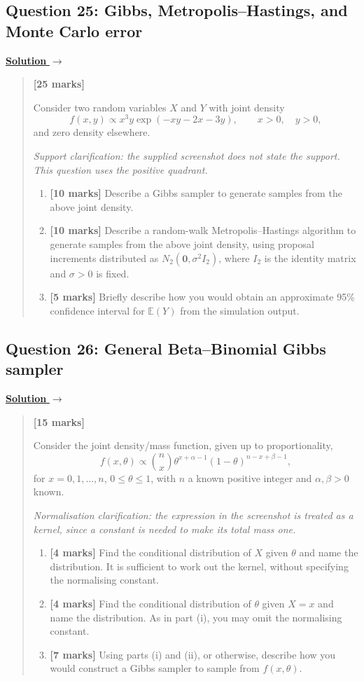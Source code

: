 \documentclass[11pt,a4paper]{article}
\newcommand{\E}{\mathbb{E}}
\newenvironment{examquestion}[2]
  {\subsection{#1}\label{question:\arabic{subsection}}\label{#2}%
   \noindent\hyperref[answer:\arabic{subsection}]{\textbf{Solution} $\rightarrow$}%
   \begin{quote}\color{statgrey}}
  {\end{quote}}
\begin{document}
\clearpage

\begin{examquestion}{Question 25: Gibbs, Metropolis--Hastings, and Monte Carlo error}{question:practice-gibbs-metropolis-hastings-and-monte-carlo-error}
\textbf{[25 marks]}

Consider two random variables $X$ and $Y$ with joint density
\[
f(x,y)\propto x^3y\exp(-xy-2x-3y),
\qquad x>0,\quad y>0,
\]
and zero density elsewhere.

\emph{Support clarification: the supplied screenshot does not state the
support. This question uses the positive quadrant.}

\begin{enumerate}[label=(\alph*)]
  \item \textbf{[10 marks]} Describe a Gibbs sampler to generate samples
        from the above joint density.
  \item \textbf{[10 marks]} Describe a random-walk Metropolis--Hastings
        algorithm to generate samples from the above joint density, using
        proposal increments distributed as $N_2(\mathbf 0,\sigma^2I_2)$,
        where $I_2$ is the identity matrix and $\sigma>0$ is fixed.
  \item \textbf{[5 marks]} Briefly describe how you would obtain an
        approximate 95\% confidence interval for $\E(Y)$ from the
        simulation output.
\end{enumerate}
\end{examquestion}

\clearpage

\begin{examquestion}{Question 26: General Beta--Binomial Gibbs sampler}{question:practice-general-beta-binomial-gibbs-sampler}
\textbf{[15 marks]}

Consider the joint density/mass function, given up to proportionality,
\[
f(x,\theta)\propto
\binom{n}{x}\theta^{x+\alpha-1}(1-\theta)^{n-x+\beta-1},
\]
for $x=0,1,\ldots,n$, $0\leq\theta\leq1$, with $n$ a known positive
integer and $\alpha,\beta>0$ known.

\emph{Normalisation clarification: the expression in the screenshot is
treated as a kernel, since a constant is needed to make its total mass one.}

\begin{enumerate}[label=(\roman*)]
  \item \textbf{[4 marks]} Find the conditional distribution of $X$ given
        $\theta$ and name the distribution. It is sufficient to work out
        the kernel, without specifying the normalising constant.
  \item \textbf{[4 marks]} Find the conditional distribution of $\theta$
        given $X=x$ and name the distribution. As in part (i), you may
        omit the normalising constant.
  \item \textbf{[7 marks]} Using parts (i) and (ii), or otherwise, describe
        how you would construct a Gibbs sampler to sample from
        $f(x,\theta)$.
\end{enumerate}
\end{examquestion}
\end{document}
